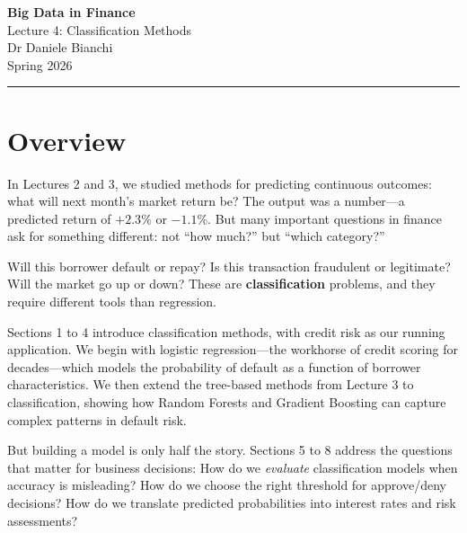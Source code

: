 \documentclass[11pt,a4paper]{article}
\newcommand{\keyword}[1]{\textbf{\textcolor{AccentOrange}{#1}}}
\begin{document}
\begin{center}
    {\LARGE\bfseries\textcolor{ThemeBlue}{Big Data in Finance}}\\[0.5em]
    {\Large Lecture 4: Classification Methods}\\[1em]
    {\large Dr Daniele Bianchi}\\[0.5em]
    {\normalsize Spring 2026}
\end{center}

\vspace{1em}
\hrule
\vspace{1em}

\tableofcontents

\vspace{2cm}

\section*{Overview}

In Lectures 2 and 3, we studied methods for predicting continuous outcomes: what will next month's market return be? The output was a number---a predicted return of $+2.3\%$ or $-1.1\%$. But many important questions in finance ask for something different: not ``how much?'' but ``which category?''

Will this borrower default or repay? Is this transaction fraudulent or legitimate? Will the market go up or down? These are \keyword{classification} problems, and they require different tools than regression.

Sections 1 to 4 introduce classification methods, with credit risk as our running application. We begin with logistic regression---the workhorse of credit scoring for decades---which models the probability of default as a function of borrower characteristics. We then extend the tree-based methods from Lecture 3 to classification, showing how Random Forests and Gradient Boosting can capture complex patterns in default risk.

But building a model is only half the story. Sections 5 to 8 address the questions that matter for business decisions: How do we \emph{evaluate} classification models when accuracy is misleading? How do we choose the right threshold for approve/deny decisions? How do we translate predicted probabilities into interest rates and risk assessments?
\end{document}
